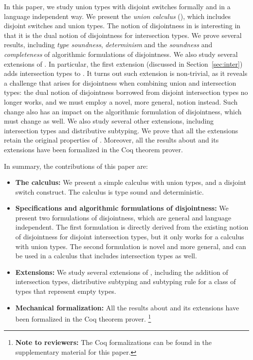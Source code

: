 In this paper, we study union types with disjoint switches formally
and in a language independent way. We present the \emph{union
  calculus} (\cal), which includes disjoint switches and union types.
The notion of disjointness in \cal is interesting in that it is
the dual notion of disjointness for intersection types.
We prove several results, including \emph{type soundness}, \emph{determinism}
and the \emph{soundness} and \emph{completeness} of algorithmic formulations
of disjointness.
We also study several extensions of \cal. In particular,
the first extension (discussed in Section~\ref{sec:inter}) adds intersection
types to \cal. It turns out such extension is non-trivial, as it reveals
a challenge that arises for disjointness when combining
union and intersection types:
the dual notion of disjointness borrowed from
disjoint intersection types no longer works, and we must employ
a novel, more general, notion instead. Such change also has an impact
on the algorithmic formulation of disjointness, which must change as
well. We also study several other extensions, including intersection
types and distributive subtyping. We prove that all the extensions retain
the original properties of \cal. Moreover, all the results about \cal and its
extensions have been formalized in the Coq theorem prover.

In summary, the contributions of this paper are:

\begin{itemize}
\item {\bf The \name calculus:} We present a simple calculus with union
  types, and a disjoint switch construct. The calculus is type sound and
  deterministic. 
\item {\bf Specifications and algorithmic formulations of disjointness:}
  We present two formulations of disjointness, which are general and
  language independent. The first formulation is directly derived from
  the existing notion of disjointness for disjoint intersection types,
  but it only works for a calculus with union types. The second formulation
  is novel and more general, and can be used in a calculus that includes
  intersection types as well.
\item {\bf Extensions:} We study several extensions of \name, including the
  addition of intersection types, distributive subtyping and
  subtyping rule for a class of types that represent empty types.
\item {\bf Mechanical formalization:}
  All the results about \cal and its
  extensions have been formalized in the Coq theorem prover.
  \footnote{{\bf Note to reviewers:} The Coq formalizations can be found in the
  supplementary material for this paper.}
\end{itemize}



